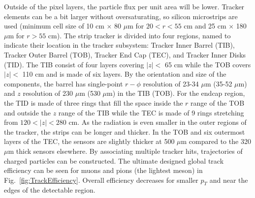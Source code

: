 Outside of the pixel layers, the particle flux per unit area will be lower. Tracker elements can be a bit larger without oversaturating, so silicon microstrips are used (minimum cell size of 10 cm $\times$ 80 $\mu$m for $20 < r < 55$ cm and 25 cm $\times$ 180 $\mu$m for $r>55$ cm). The strip tracker is divided into four regions, named to indicate their location in the tracker subsystem: Tracker Inner Barrel (TIB), Tracker Outer Barrel (TOB), Tracker End Cap (TEC), and Tracker Inner Disks (TID). The TIB consist of four layers covering $|z|<$ 65 cm while the TOB covers $|z|<$ 110 cm and is made of six layers. By the orientation and size of the components, the barrel has single-point $r-\phi$ resolution of 23-34 $\mu$m (35-52 $\mu$m) and $z$ resolution of 230 $\mu$m (530 $\mu$m) in the TIB (TOB). For the endcap region, the TID is made of three rings that fill the space inside the $r$ range of the TOB and outside the $z$ range of the TIB while the TEC is made of 9 rings stretching from $120 < |z| < 280$ cm. As the radiation is even smaller in the outer regions of the tracker, the strips can be longer and thicker. In the TOB and six outermost layers of the TEC, the sensors are slightly thicker at 500 $\mu$m compared to the 320 $\mu$m thick sensors elsewhere. By associating multiple tracker hits, trajectories of charged particles can be constructed. The ultimate designed global track efficiency can be seen for muons and pions (the lightest meson) in Fig.~\ref{fig:TrackEfficiency}. Overall efficiency decreases for smaller $p_T$ and near the edges of the detectable region.

